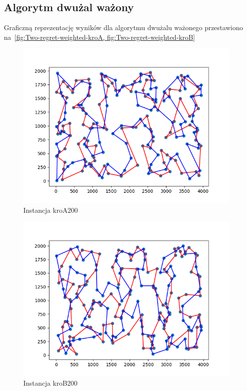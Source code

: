\documentclass[11pt]{article}
\begin{document}
\subsection{Algorytm dwużal ważony}\label{subsec:algorytm-dwużal-ważony}
Graficzną reprezentację wyników dla algorytmu dwużalu ważonego przestawiono na~\ref{fig:Two-regret-weighted-kroA, fig:Two-regret-weighted-kroB}
\begin{figure}[H]
    \centering
    \includegraphics{best_paths/weighted_two_regret_kroA200.tsp.png}
    \caption{Instancja kroA200}
    \label{fig:Two-regret-weighted-kroA}
\end{figure}
\begin{figure}[H]
    \centering
    \includegraphics{best_paths/weighted_two_regret_kroB200.tsp.png}
    \caption{Instancja kroB200}
    \label{fig:Two-regret-weighted-kroB}
\end{figure}
\end{document}
